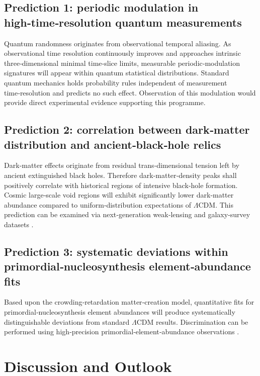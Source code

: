 \documentclass[12pt,a4paper]{article}
\begin{document}
\subsection{Prediction 1: periodic modulation in high‑time‑resolution quantum measurements}
Quantum randomness originates from observational temporal aliasing. As observational time resolution continuously improves and approaches intrinsic three‑dimensional minimal time‑slice limits, measurable periodic‑modulation signatures will appear within quantum statistical distributions. Standard quantum mechanics holds probability rules independent of measurement time‑resolution and predicts no such effect. Observation of this modulation would provide direct experimental evidence supporting this programme.

\subsection{Prediction 2: correlation between dark‑matter distribution and ancient‑black‑hole relics}
Dark‑matter effects originate from residual trans‑dimensional tension left by ancient extinguished black holes. Therefore dark‑matter‑density peaks shall positively correlate with historical regions of intensive black‑hole formation. Cosmic large‑scale void regions will exhibit significantly lower dark‑matter abundance compared to uniform‑distribution expectations of $\Lambda$CDM. This prediction can be examined via next‑generation weak‑lensing and galaxy‑survey datasets \cite{kaiser1992,des2021}.

\subsection{Prediction 3: systematic deviations within primordial‑nucleosynthesis element‑abundance fits}
Based upon the crowding‑retardation matter‑creation model, quantitative fits for primordial‑nucleosynthesis element abundances will produce systematically distinguishable deviations from standard $\Lambda$CDM results. Discrimination can be performed using high‑precision primordial‑element‑abundance observations \cite{burbidge1957,coc2015}.

\section{Discussion and Outlook}
\end{document}

